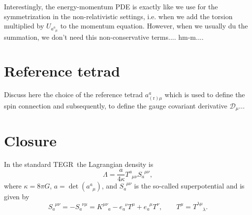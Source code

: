 \documentclass[
10pt, %
a4paper, %
oneside, %
headinclude,footinclude, %
BCOR5mm, %
]{scrartcl}
\newcommand{\itetr}[2]{e^{\phantom{#2}#1}_{#2}}
\newcommand{\tetr}[2]{a^{#1}_{\phantom{#1}#2}}
\newcommand{\rtetr}[2]{a^{#1}_{(\text{r}) #2}}
\newcommand{\D}[1]{\mathcal{D}_{#1}} %
\newcommand{\Tors}[2]{T^{#1}_{\phantom{a}#2}}
\newcommand{\Supp}[2]{S_{#1}^{\phantom{a}#2}}	%
\newcommand{\tegr}{TEGR}
\begin{document}
{\color{Red} Interestingly, the energy-momentum PDE is exactly like we use for the symmetrization 
in the non-relativistic settings, i.e. when we add the torsion multiplied by $ U_{\tetr{a}{\mu}} $ 
to the momentum equation. However, when we usually du the summation, we don't need this 
non-conservative terms.... hm-m....}

\section{Reference tetrad}

Discuss here the choice of the reference tetrad $ \rtetr{a}{\mu} $ which is used to define the spin 
connection and 
subsequently, to define the gauge covariant derivative $ \D{\mu} $...


\section{Closure}



In the standard \tegr\ the Lagrangian density is %
\begin{equation}
\Lambda = \frac{a}{4\kappa} \Tors{a}{\mu\nu}\Supp{a}{\mu\nu},
\end{equation}
where $ \kappa = 8 \pi G $, $ a = \det(\tetr{a}{\mu}) $, and $ \Supp{a}{\mu\nu} $ is the so-called 
superpotential and is given by
\begin{equation}
\Supp{a}{\mu\nu} = -\Supp{a}{\nu\mu} = K^{\mu\nu}_{\phantom{\mu\nu}a} - \itetr{\nu}{a} T^\mu + 
\itetr{\mu}{a} 
T^\nu, \qquad T^\mu = T^{\lambda\mu}_{\phantom{\lambda\mu}\lambda}.
\end{equation}



\printbibliography
\end{document}
